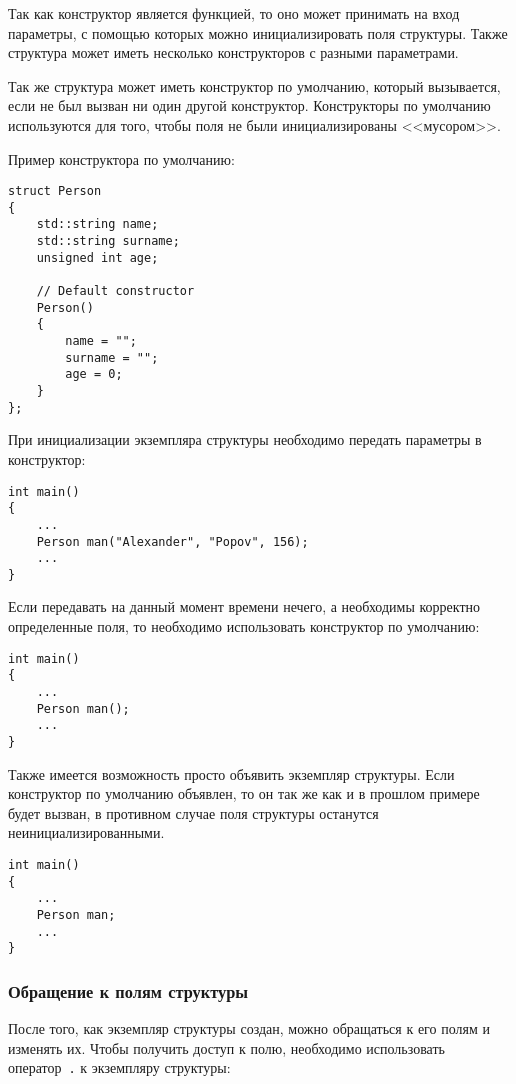 Так как конструктор является функцией, то оно может принимать на вход параметры, с помощью которых можно инициализировать поля структуры. Также структура может иметь несколько конструкторов с разными параметрами.

Так же структура может иметь конструктор по умолчанию, который вызывается, если не был вызван ни один другой конструктор. Конструкторы по умолчанию используются для того, чтобы поля не были инициализированы <<мусором>>.

Пример конструктора по умолчанию:
\begin{lstlisting}
struct Person
{
    std::string name;
    std::string surname;
    unsigned int age;

    // Default constructor
    Person()
    {
        name = "";
        surname = "";
        age = 0;
    }
};
\end{lstlisting}


При инициализации экземпляра структуры необходимо передать параметры в конструктор:
\begin{lstlisting}
int main()
{
    ...
    Person man("Alexander", "Popov", 156);
    ...
}
\end{lstlisting}

Если передавать на данный момент времени нечего, а необходимы корректно определенные поля, то необходимо использовать конструктор по умолчанию:
\begin{lstlisting}
int main()
{
    ...
    Person man();
    ...
}
\end{lstlisting}

Также имеется возможность просто объявить экземпляр структуры.
Если конструктор по умолчанию объявлен, то он так же как и в прошлом примере будет вызван,
в противном случае поля структуры останутся неинициализированными.

\begin{lstlisting}
int main()
{
    ...
    Person man;
    ...
}
\end{lstlisting}

\subsubsection{Обращение к полям структуры}

После того, как экземпляр структуры создан, можно обращаться к его полям и изменять их. Чтобы получить доступ к полю, необходимо использовать оператор~\lstinline|.| к экземпляру структуры:

